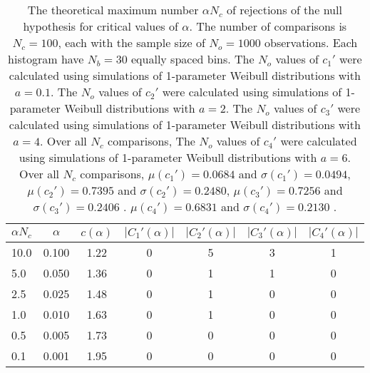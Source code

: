 \begin{table}[h!]
\begin{center}
\begin{tabular}{| l | c | c | c | c | c | c |}\hline
$\alpha N_c$ & $\alpha$ & $c(\alpha)$ & $|C_1'(\alpha)|$ & $|C_2'(\alpha)|$ & $|C_3'(\alpha)|$ & $|C_4'(\alpha)|$ \\\hline
10.0 & 0.100 & 1.22 & 0 & 5 & 3 & 1 \\\hline
5.0 & 0.050 & 1.36 & 0 & 1 & 1 & 0 \\\hline
2.5 & 0.025 & 1.48 & 0 & 1 & 0 & 0 \\\hline
1.0 & 0.010 & 1.63 & 0 & 1 & 0 & 0 \\\hline
0.5 & 0.005 & 1.73 & 0 & 0 & 0 & 0 \\\hline
0.1 & 0.001 & 1.95 & 0 & 0 & 0 & 0 \\\hline
\end{tabular}
\caption{The theoretical maximum number $\alpha N_c$ of rejections
of the null hypothesis for critical values of $\alpha$.
The number of comparisons is $N_c=100$,
each with the sample size of $N_o=1000$ observations.
Each histogram have $N_b=30$ equally spaced bins.
The $N_o$ values of $c_1'$ were calculated using simulations of
 1-parameter Weibull distributions with $a=0.1$.
The $N_o$ values of $c_2'$ were calculated using simulations of
 1-parameter Weibull distributions with $a=2$.
The $N_o$ values of $c_3'$ were calculated using simulations of
 1-parameter Weibull distributions with $a=4$.
Over all $N_c$ comparisons,
The $N_o$ values of $c_4'$ were calculated using simulations of
 1-parameter Weibull distributions with $a=6$.
Over all $N_c$ comparisons,
 $\mu(c_1')=0.0684$ and $\sigma(c_1')=0.0494$,
 $\mu(c_2')=0.7395$ and $\sigma(c_2')=0.2480$,
 $\mu(c_3')=0.7256$ and $\sigma(c_3')=0.2406$ .
 $\mu(c_4')=0.6831$ and $\sigma(c_4')=0.2130$ .
}
\end{center}
\end{table}